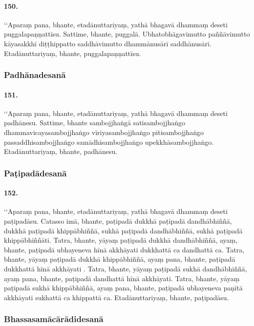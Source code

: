 \paragraph{150.} ‘‘Aparaṃ pana, bhante, etadānuttariyaṃ, yathā bhagavā dhammaṃ deseti puggalapaṇṇattīsu. Sattime, bhante, puggalā. Ubhatobhāgavimutto paññāvimutto kāyasakkhī diṭṭhippatto saddhāvimutto dhammānusārī saddhānusārī. Etadānuttariyaṃ, bhante, puggalapaṇṇattīsu.

\subsubsection{Padhānadesanā}

\paragraph{151.} ‘‘Aparaṃ pana, bhante, etadānuttariyaṃ, yathā bhagavā dhammaṃ deseti padhānesu. Sattime, bhante sambojjhaṅgā satisambojjhaṅgo dhammavicayasambojjhaṅgo vīriyasambojjhaṅgo pītisambojjhaṅgo passaddhisambojjhaṅgo samādhisambojjhaṅgo upekkhāsambojjhaṅgo. Etadānuttariyaṃ, bhante, padhānesu.

\subsubsection{Paṭipadādesanā}

\paragraph{152.} ‘‘Aparaṃ pana, bhante, etadānuttariyaṃ, yathā bhagavā dhammaṃ deseti paṭipadāsu. Catasso imā, bhante, paṭipadā dukkhā paṭipadā dandhābhiññā, dukkhā paṭipadā khippābhiññā, sukhā paṭipadā dandhābhiññā, sukhā paṭipadā khippābhiññāti. Tatra, bhante, yāyaṃ paṭipadā dukkhā dandhābhiññā, ayaṃ, bhante, paṭipadā ubhayeneva hīnā akkhāyati dukkhattā ca dandhattā ca. Tatra, bhante, yāyaṃ paṭipadā dukkhā khippābhiññā, ayaṃ pana, bhante, paṭipadā dukkhattā hīnā akkhāyati . Tatra, bhante, yāyaṃ paṭipadā sukhā dandhābhiññā, ayaṃ pana, bhante, paṭipadā dandhattā hīnā akkhāyati. Tatra, bhante, yāyaṃ paṭipadā sukhā khippābhiññā, ayaṃ pana, bhante, paṭipadā ubhayeneva paṇītā akkhāyati sukhattā ca khippattā ca. Etadānuttariyaṃ, bhante, paṭipadāsu.

\subsubsection{Bhassasamācārādidesanā}

